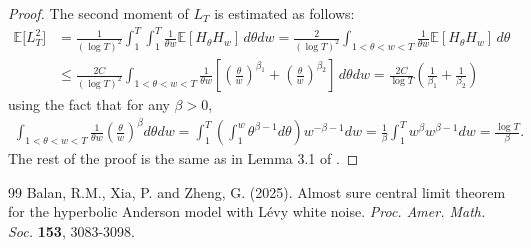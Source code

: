 \documentclass[10pt,a4paper]{amsart}
\def\bE{\mathbb{E}}
\begin{document}
\begin{proof}
The second moment of $L_T$ is estimated as follows: 
\begin{align*}
\bE\big[ L_T^2 \big]
&= \frac{1}{(\log T)^2} \int_1^T \int_1^T \frac{1}{\theta w}  \bE[ H_\theta H_w ] \,d\theta dw =\frac{2}{(\log T)^2} \int_{1<\theta<w<T} \frac{1}{\theta w}  \bE[ H_\theta H_w ] \,d\theta \\
&\leq \frac{2C}{(\log T)^2} \int_{1<\theta<w<T}  \frac{1}{\theta w}
  \left[\left( \frac{\theta}{w} \right)^{\beta_1}+\left( \frac{\theta}{w} \right)^{\beta_2}\right] \,d\theta dw=\frac{2C}{\log T}\left( \frac{1}{\beta_1}+\frac{1}{\beta_2}\right)
 \end{align*}
using the fact that for any $\beta>0$,
\begin{align*}
\int_{1<\theta<w<T} \frac{1}{\theta w} \left( \frac{\theta}{w} \right)^{\beta} d\theta dw=\int_1^T \left(\int_1^w \theta^{\beta-1}d\theta \right)w^{-\beta-1}dw=\frac{1}{\beta}\int_1^T w^{\beta}w^{\beta-1}dw=\frac{\log T}{\beta}.
\end{align*}
The rest of the proof is the same as in Lemma 3.1 of \cite{BXZ}.

\end{proof}

\begin{thebibliography}{99}
 Balan, R.M., Xia, P. and Zheng, G. (2025). Almost sure central limit theorem for the hyperbolic Anderson model with L\'evy white noise. {\em Proc. Amer. Math. Soc.} {\bf 153}, 3083-3098. %
\end{thebibliography}
\end{document}
